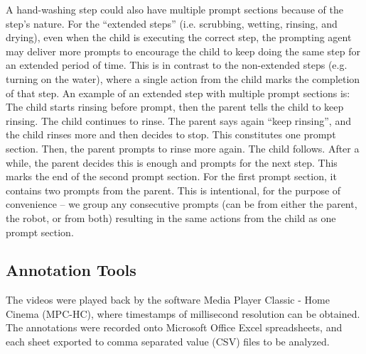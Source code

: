 A hand-washing step could also have multiple prompt sections because of the step's nature.  For the ``extended steps'' (i.e. scrubbing, wetting, rinsing, and drying), even when the child is executing the correct step, the prompting agent may deliver more prompts to encourage the child to keep doing the same step for an extended period of time.  This is in contrast to the non-extended steps (e.g. turning on the water), where a single action from the child marks the completion of that step.  An example of an extended step with multiple prompt sections is: The child starts rinsing before prompt, then the parent tells the child to keep rinsing.  The child continues to rinse.  The parent says again ``keep rinsing'', and the child rinses more and then decides to stop.  This constitutes one prompt section.  Then, the parent prompts to rinse more again.  The child follows.  After a while, the parent decides this is enough and prompts for the next step.  This marks the end of the second prompt section.  For the first prompt section, it contains two prompts from the parent.  This is intentional, for the purpose of convenience -- we group any consecutive prompts (can be from either the parent, the robot, or from both) resulting in the same actions from the child as one prompt section.



\subsection{Annotation Tools}
The videos were played back by the software Media Player Classic - Home Cinema (MPC-HC), where timestamps of millisecond resolution can be obtained.  The annotations were recorded onto Microsoft Office Excel spreadsheets, and each sheet exported to comma separated value (CSV) files to be analyzed.

